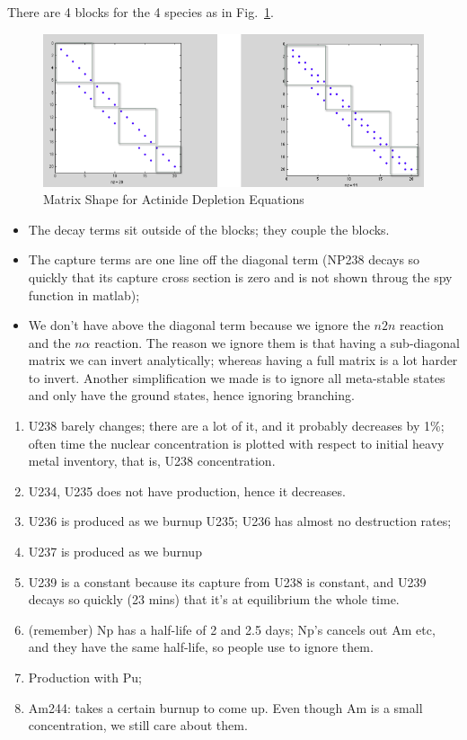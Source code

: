 \documentclass{school-22.211-notes}
\begin{document}
There are 4 blocks for the 4 species as in Fig.~\ref{actinide-block}. 
\begin{figure}[ht]
  \centering
  \includegraphics[width=5in]{images/dfs/actinide-block.png}
  \caption{Matrix Shape for Actinide Depletion Equations} \label{actinide-block} 
    \end{figure}
\begin{itemize}
\item The decay terms sit outside of the blocks; they couple the blocks.
\item  The capture terms are one line off the diagonal term (NP238 decays so quickly that its capture cross section is zero and is not shown throug the spy function in matlab); 
\item We don't have above the diagonal term because we ignore the $n2n$ reaction and the $n \alpha$ reaction. The reason we ignore them is that having a sub-diagonal matrix we can invert analytically; whereas having a full matrix is a lot harder to invert. Another simplification we made is to ignore all meta-stable states and only have the ground states, hence ignoring branching. 
\end{itemize}

\clearpage
{}
\begin{enumerate}
\item U238 barely changes; there are a lot of it, and it probably decreases by 1\%; often time the nuclear concentration is plotted with respect to initial heavy metal inventory, that is, U238 concentration. 
\item U234, U235 does not have production, hence it decreases. 
\item U236 is produced as we burnup U235; U236 has almost no destruction rates;
\item U237 is produced as we burnup 
\item U239 is a constant because its capture from U238 is constant, and U239 decays so quickly (23 mins) that it's at equilibrium the whole time. 
\item (remember) Np has a half-life of 2 and 2.5 days; Np's cancels out Am etc, and they have the same half-life, so people use to ignore them. 
\item Production with Pu; 
\item Am244: takes a certain burnup to come up. Even though Am is a small concentration, we still care about them. 
\end{enumerate}
\end{document}

